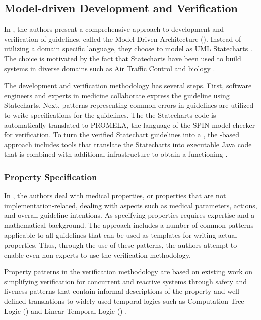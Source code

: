 \subsection{Model-driven Development and Verification}

In \cite{PerezJBI10}, the authors present a comprehensive approach
to development and verification of guidelines, called the Model Driven
Architecture (\MDA{}). Instead of
utilizing a domain specific language, they choose to model \BPGs{}
as UML Statecharts \cite{OMGSpecUrl}. The choice is motivated by
the fact that Statecharts have been used to build systems in diverse
domains such as Air Traffic Control \cite{WhittleICSE02} and biology
\cite{EfroniGR03}.

The development and verification methodology has several steps.
First, software engineers and experts in medicine collaborate
express the guideline using Statecharts. Next, patterns
representing common errors in guidelines are utilized to
write specifications for the guidelines. The
the Statecharts code is automatically translated to PROMELA,
the language of the SPIN model checker \cite{MikkISFST98} for verification.
To turn the verified Statechart guidelines into a \CDSS{}, the
\MDA{}-based approach includes tools that translate the Statecharts into
executable Java code that is combined with additional infrastructure to
obtain a functioning \CDSS{}.

\subsubsection{Property Specification}

In \cite{PerezJBI10}, the authors deal with
medical properties, or properties that are not implementation-related,
dealing with aspects such as  medical parameters, \HCP{} actions,
and overall guideline intentions. As specifying properties
requires expertise and a mathematical background. The \MDA{}
approach includes a number of common patterns applicable
to all guidelines that can be
used as templates for writing actual properties. Thus,
through the use of these patterns, the authors attempt
to enable even non-experts to use the \MDA{} verification
methodology.

Property patterns in the \MDA{} verification methodology
are based on existing work on simplifying verification for
concurrent and reactive systems through safety and liveness patterns
that contain informal descriptions of the property and
well-defined translations to widely used temporal logics such
as Computation Tree Logic (\CTL{}) and Linear Temporal Logic (\LTL{})
\cite{DwyerFM98,DwyerICSE98,BitschSAFECOMP01,RyndinaThesis05}.

